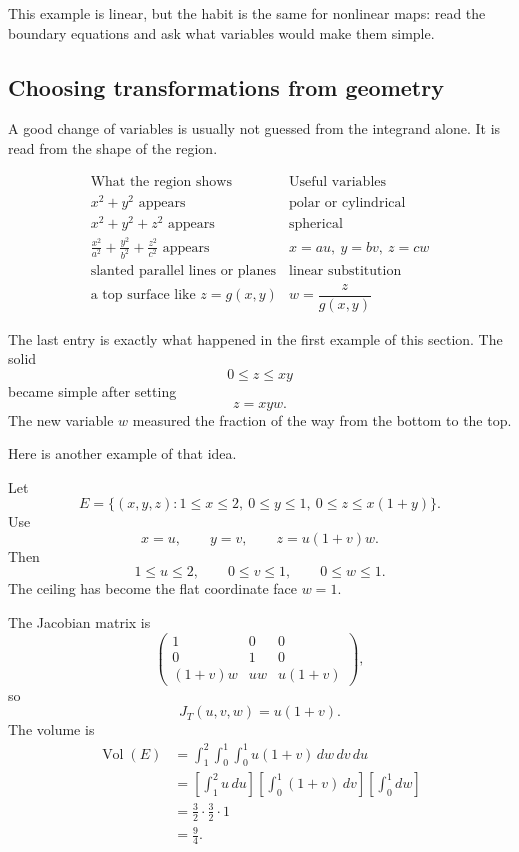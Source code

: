 This example is linear, but the habit is the same for nonlinear maps: read the boundary
equations and ask what variables would make them simple.

\subsection{Choosing transformations from geometry}

A good change of variables is usually not guessed from the integrand alone.  It is read
from the shape of the region.

\[
\begin{array}{c|c}
\text{What the region shows} & \text{Useful variables} \\ \hline
x^2+y^2 \text{ appears} & \text{polar or cylindrical}\\[1mm]
x^2+y^2+z^2 \text{ appears} & \text{spherical}\\[1mm]
\frac{x^2}{a^2}+\frac{y^2}{b^2}+\frac{z^2}{c^2} \text{ appears}
& x=au,\ y=bv,\ z=cw\\[1mm]
\text{slanted parallel lines or planes} & \text{linear substitution}\\[1mm]
\text{a top surface like } z=g(x,y) & w=\dfrac{z}{g(x,y)}
\end{array}
\]

The last entry is exactly what happened in the first example of this section.  The solid
\[
    0\le z\le xy
\]
became simple after setting
\[
    z=xyw.
\]
The new variable \(w\) measured the fraction of the way from the bottom to the top.

Here is another example of that idea.

\begin{example}
Let
\[
    E=\{(x,y,z):1\le x\le2,\ 0\le y\le1,\ 0\le z\le x(1+y)\}.
\]
Use
\[
    x=u,\qquad y=v,\qquad z=u(1+v)w.
\]
Then
\[
    1\le u\le2,\qquad 0\le v\le1,\qquad 0\le w\le1.
\]
The ceiling has become the flat coordinate face \(w=1\).

The Jacobian matrix is
\[
    \begin{pmatrix}
        1&0&0\\
        0&1&0\\
        (1+v)w&uw&u(1+v)
    \end{pmatrix},
\]
so
\[
    J_T(u,v,w)=u(1+v).
\]
The volume is
\[
\begin{aligned}
    \operatorname{Vol}(E)
    &=
    \int_1^2\int_0^1\int_0^1 u(1+v)\,dw\,dv\,du\\
    &=
    \left[\int_1^2u\,du\right]
    \left[\int_0^1(1+v)\,dv\right]
    \left[\int_0^1dw\right]\\
    &=
    \frac32\cdot\frac32\cdot1\\
    &=
    \frac94.
\end{aligned}
\]
\end{example}


